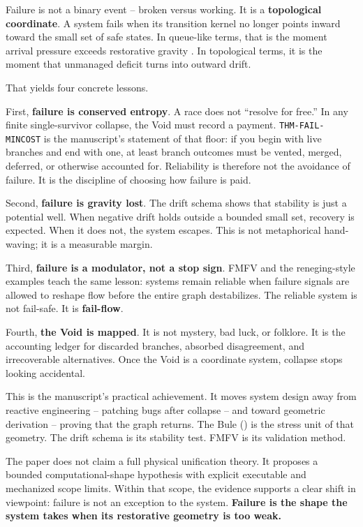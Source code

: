 \documentclass[
]{article}
\begin{document}
Failure is not a binary event -- broken versus working. It is a
\textbf{topological coordinate}. A system fails when its transition
kernel no longer points inward toward the small set of safe states. In
queue-like terms, that is the moment arrival pressure exceeds
restorative gravity . In topological terms, it is the moment that
unmanaged deficit turns into outward drift.

That yields four concrete lessons.

First, \textbf{failure is conserved entropy}. A race does not ``resolve
for free.'' In any finite single-survivor collapse, the Void must record
a payment. \texttt{THM-FAIL-MINCOST} is the manuscript's statement of
that floor: if you begin with live branches and end with one, at least
branch outcomes must be vented, merged, deferred, or otherwise accounted
for. Reliability is therefore not the avoidance of failure. It is the
discipline of choosing how failure is paid.

Second, \textbf{failure is gravity lost}. The drift schema shows that
stability is just a potential well. When negative drift holds outside a
bounded small set, recovery is expected. When it does not, the system
escapes. This is not metaphorical hand-waving; it is a measurable
margin.

Third, \textbf{failure is a modulator, not a stop sign}. FMFV and the
reneging-style examples teach the same lesson: systems remain reliable
when failure signals are allowed to reshape flow before the entire graph
destabilizes. The reliable system is not fail-safe. It is
\textbf{fail-flow}.

Fourth, \textbf{the Void is mapped}. It is not mystery, bad luck, or
folklore. It is the accounting ledger for discarded branches, absorbed
disagreement, and irrecoverable alternatives. Once the Void is a
coordinate system, collapse stops looking accidental.

This is the manuscript's practical achievement. It moves system design
away from reactive engineering -- patching bugs after collapse -- and
toward geometric derivation -- proving that the graph returns. The Bule
() is the stress unit of that geometry. The drift schema is its
stability test. FMFV is its validation method.

The paper does not claim a full physical unification theory. It proposes
a bounded computational-shape hypothesis with explicit executable and
mechanized scope limits. Within that scope, the evidence supports a
clear shift in viewpoint: failure is not an exception to the system.
\textbf{Failure is the shape the system takes when its restorative
geometry is too weak.}
\end{document}
